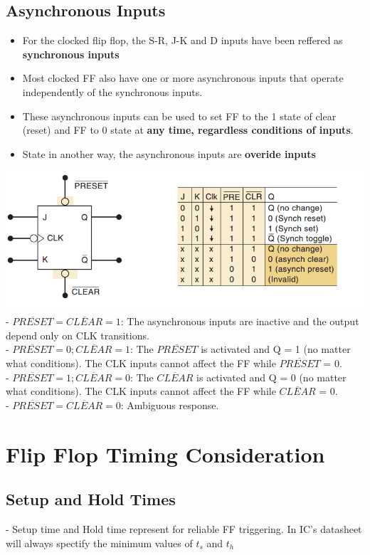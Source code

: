 \documentclass[12pt]{article}
\begin{document}
\subsection{Asynchronous Inputs}
\begin{itemize}
	\item For the clocked flip flop, the S-R, J-K and D inputs have been reffered as \textbf{synchronous inputs} 
	\item Most clocked FF also have one or more asynchronous inputs that operate independently of the synchronous inputs. 
	\item These asynchronous inputs can be used to set FF to the 1 state of clear (reset) and FF to 0 state at \textbf{any time, regardless conditions of inputs}.
	\item State in another way, the asynchronous inputs are \textbf{overide inputs}
\end{itemize}
\includegraphics[scale = 0.85]{hinh15.png}
\bigbreak
- $\overline{PRESET} = \overline{CLEAR} = 1$: The asynchronous inputs are inactive and the output depend only on CLK transitions. \\
- $\overline{PRESET} = 0; \overline{CLEAR} = 1$: The $\overline{PRESET}$ is activated and Q = 1 (no matter what conditions). The CLK inputs cannot affect the FF while $\overline{PRESET}$ = 0. \\
- $\overline{PRESET} = 1; \overline{CLEAR} = 0$: The $\overline{CLEAR}$ is activated and Q = 0 (no matter what conditions). The CLK inputs cannot affect the FF while $\overline{CLEAR}$ = 0. \\
- $\overline{PRESET} = \overline{CLEAR} = 0$: Ambiguous response. \\
\section{Flip Flop Timing Consideration}
\subsection{Setup and Hold Times}
- Setup time and Hold time represent for reliable FF triggering. In IC's datasheet will always spectify the minimum values of $t_s$ and $t_h$
\end{document}
